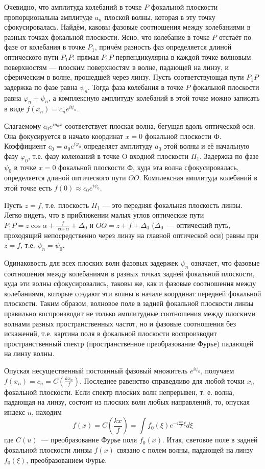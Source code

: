 Очевидно, что амплитуда колебаний в точке $P$ фокальной плоскости пропорциональна амплитуде $a_n$ плоской волны, которая в эту точку сфокусировалась. Найдём, каковы фазовые соотношения между колебаниями в разных точках фокальной плоскости. Ясно, что колебание в точке $P$  отстаёт по фазе от колебания в точке $P_1$, причём разность фаз определяется длиной оптического пути $P_1P$: прямая $P_1P$ перпендикулярна в каждой точке волновым поверхностям ---  плоским поверхностям в волне, падающей на линзу, и сферическим в волне, прошедшей через линзу.  Пусть соответствующая пути $P_1P$ задержка по фазе равна $\psi_n$. Тогда фаза колебания в точке $P$ фокальной плоскости равна $\varphi_n + \psi_n$, а комплексную амплитуду колебаний в этой точке можно записать в виде $f(x_n) = c_ne^{i\psi_n}$.

Слагаемому $c_0e^{iu_0x}$ соответствует плоская волна, бегущая вдоль оптической оси. Она фокусируется в начало координат $x=0$ фокальной плоскости Ф. Коэффициент $c_0 = a_0e^{i\varphi_0}$ определяет амплитуду $a_0$ этой волны и её начальную фазу $\varphi_0$, т.е. фазу колеюаний в точке O входной плоскости $\Pi_1$. Задержка по фазе $\psi_0$ в точке $x=0$ фокальной плоскости Ф, куда эта волна сфокусировалась, определяется длиной оптического пути $OO$. Комплексная амплитуда колебаний в этой точке есть $f(0) \approx c_0 e^{i\psi_0}$.

Пусть $z = f$, т.е. плоскость $\Pi_1$ --- это передняя фокальная плоскость линзы. Легко видеть, что в приближении малых углов оптические пути $P_1P = z\cos\alpha + \frac{f}{\cos\alpha} + \Delta_0$ и $OO = z + f + \Delta_0$ ($\Delta_0$~--- оптический путь, проходящий непосредственно через линзу на главной оптической оси) равны при $z=f$, т.е. $\psi_n = \psi_0$.

Одинаковость для всех плоских волн фазовых задержек $\psi_n$ означает, что фазовые соотношения между колебаниями в разных точках задней фокальной плоскости, куда эти волны сфокусировались, таковы же, как и фазовые соотношения между колебаниями, которые создают эти волны в начале координат передней фокальной плоскости. Таким образом, волновое поле в задней фокальной плоскости линзы правильно воспроизводит не только амплитудные соотношения между плоскими волнами разных пространственных частот, но и фазовые соотношения без искажений, т.е. картина поля в фокальной плоскости воспроизводит пространственный спектр (пространственное преобразование Фурье) падающей на линзу волны.

Опуская несущественный постоянный фазовый множитель $e^{i\psi_0}$, получаем $f(x_n) = c_n = C(\frac{kx_n}{f})$. Последнее равенство справедливо для любой точки $x_n$  фокальной плоскости. Если спектр плоских волн непрерывен, т. е. волна, падающая на линзу, состоит из плоских волн любых направлений, то, опуская индекс $n$, находим
\[
f(x) = C\left(\frac{kx}{f}\right) = \int f_0(\xi) e^{-i\frac{kx}{f}\xi} d\xi
\]
где $C(u)$~--- преобразование Фурье поля $f_0(x)$. Итак, световое поле в задней фокальной плоскости линзы $f(x)$ связано с полем волны, падающей на линзу $f_0(\xi)$, преобразованием Фурье.

